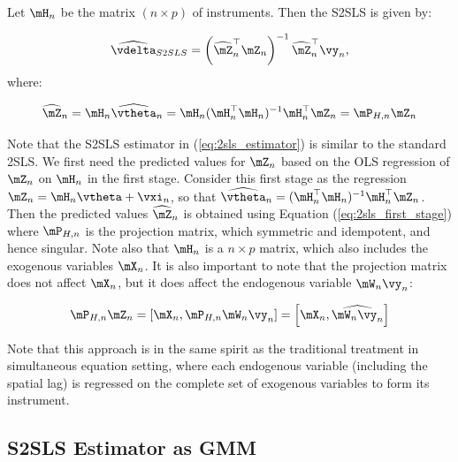 \documentclass[english,12pt]{book}\usepackage[]{graphicx}\usepackage[]{xcolor}
\begin{document}
\begin{definition}
Let $\mH_n$ be the matrix $(n\times p)$ of instruments. Then the S2SLS is given by:

\begin{equation}\label{eq:2sls_estimator}
  \widehat{\vdelta}_{S2SLS} =  \left(\widehat{\mZ}_n^\top\mZ_n\right)^{-1}\widehat{\mZ}^\top_n\vy_n,
\end{equation}
%
where:

\begin{equation}\label{eq:2sls_first_stage}
\widehat{\mZ}_n = \mH_n \widehat{\vtheta}_n = \mH_n(\mH^\top_n\mH_n)^{-1}\mH^\top_n\mZ_n = \mP_{H, n}\mZ_n
\end{equation}
\end{definition}

Note that the S2SLS estimator in (\ref{eq:2sls_estimator}) is similar to the standard 2SLS. We first need the predicted values for $\mZ_n$ based on the OLS regression of $\mZ_n$ on $\mH_n$ in the first stage. Consider this first stage as the regression $\mZ_n = \mH_n\vtheta + \vxi_n$, so that $\widehat{\vtheta}_n = (\mH^\top_n\mH_n)^{-1}\mH^\top_n\mZ_n$. Then the predicted values $\widehat{\mZ}_n$ is obtained using Equation (\ref{eq:2sls_first_stage}) where $\mP_{H,n}$ is the projection matrix, which symmetric and idempotent, and hence singular. Note also that $\mH_n$ is a $n\times p$ matrix, which also includes the exogenous variables $\mX_n$. It is also important to note that the projection matrix does not affect $\mX_n$, but it does affect the endogenous variable $\mW_n\vy_n$:

\begin{equation}
  \mP_{H, n}\mZ_n = \left[\mX_n, \mP_{H, n}\mW_n\vy_n\right] = \left[\mX_n, \widehat{\mW_n\vy_n}\right]
\end{equation}

Note that this approach is in the same spirit as the traditional treatment in simultaneous equation setting, where each endogenous variable (including the spatial lag) is regressed on the complete set of exogenous variables to form its instrument. 


\subsection{S2SLS Estimator as GMM}
\end{document}
